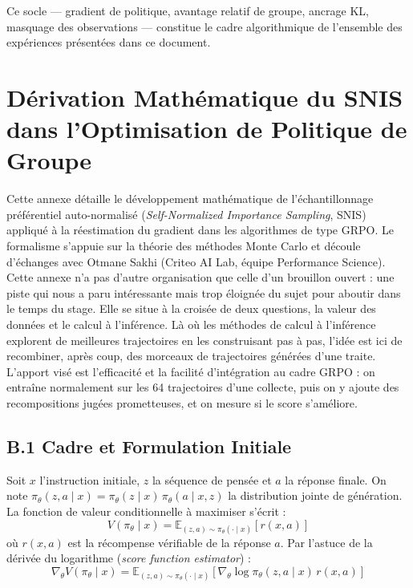 \documentclass[11pt,a4paper]{article}
\begin{document}
Ce socle — gradient de politique, avantage relatif de groupe, ancrage KL, masquage des observations — constitue le cadre algorithmique de l'ensemble des expériences présentées dans ce document.










\newpage


\section{Dérivation Mathématique du SNIS dans l'Optimisation de Politique de Groupe}
\label{sec:annexe_snis}

Cette annexe détaille le développement mathématique de l'échantillonnage préférentiel auto-normalisé (\emph{Self-Normalized Importance Sampling}, SNIS) appliqué à la réestimation du gradient dans les algorithmes de type GRPO. Le formalisme s'appuie sur la théorie des méthodes Monte Carlo \cite[chap.~9]{owen2013montecarlo} et découle d'échanges avec Otmane Sakhi (Criteo AI Lab, équipe Performance Science). Cette annexe n'a pas d'autre organisation que celle d'un brouillon ouvert : une piste qui nous a paru intéressante mais trop éloignée du sujet pour aboutir dans le temps du stage. Elle se situe à la croisée de deux questions, la valeur des données et le calcul à l'inférence. Là où les méthodes de calcul à l'inférence~\cite{snell2024scaling} explorent de meilleures trajectoires en les construisant pas à pas, l'idée est ici de recombiner, après coup, des morceaux de trajectoires générées d'une traite. L'apport visé est l'efficacité et la facilité d'intégration au cadre GRPO : on entraîne normalement sur les 64 trajectoires d'une collecte, puis on y ajoute des recompositions jugées prometteuses, et on mesure si le score s'améliore.


\subsection*{B.1 Cadre et Formulation Initiale}
Soit $x$ l'instruction initiale, $z$ la séquence de pensée et $a$ la réponse finale. On note $\pi_\theta(z, a \mid x) = \pi_\theta(z \mid x)\, \pi_\theta(a \mid x, z)$ la distribution jointe de génération. La fonction de valeur conditionnelle à maximiser s'écrit :
\begin{equation}
V(\pi_\theta \mid x) = \mathbb{E}_{(z,a) \sim \pi_\theta(\cdot \mid x)} \left[ r(x,a) \right]
\end{equation}
où $r(x,a)$ est la récompense vérifiable de la réponse $a$. Par l'astuce de la dérivée du logarithme (\emph{score function estimator}) :
\begin{equation}
\nabla_\theta V(\pi_\theta \mid x) = \mathbb{E}_{(z,a) \sim \pi_\theta(\cdot \mid x)} \left[ \nabla_\theta \log \pi_\theta(z,a \mid x) \, r(x,a) \right]
\label{eq:snis_gradient_base}
\end{equation}
\end{document}
